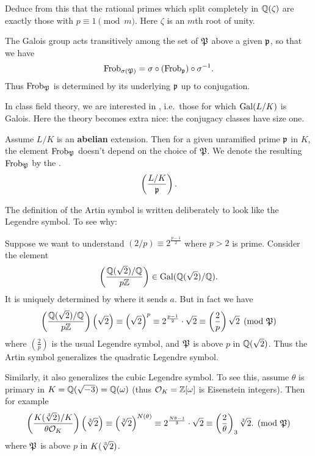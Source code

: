 \begin{exercise}
	Deduce from this that the rational primes which split completely
	in $\mathbb Q(\zeta)$ are exactly those with $p \equiv 1 \pmod m$.
	Here $\zeta$ is an $m$th root of unity.
\end{exercise}

The Galois group acts transitively among the set of $\mathfrak P$ above a given $\mathfrak p$,
so that we have
\[ \mathrm{Frob}_{\sigma(\mathfrak P)} = \sigma \circ (\mathrm{Frob}_{\mathfrak p}) \circ \sigma^{-1}.  \]
Thus $\mathrm{Frob}_\mathfrak P$ is determined by its underlying $\mathfrak p$ up to conjugation.

In class field theory, we are interested in ,
i.e.\ those for which $\operatorname{Gal}(L/K)$ is Galois.
Here the theory becomes extra nice:
the conjugacy classes have size one.
\begin{definition}
	Assume $L/K$ is an \textbf{abelian} extension.
	Then for a given unramified prime $\mathfrak p$ in $K$,
	the element $\mathrm{Frob}_\mathfrak P$ doesn't depend on the choice of $\mathfrak P$.
	We denote the resulting $\mathrm{Frob}_\mathfrak P$ by the .
	\[ \left( \frac{L/K}{\mathfrak p} \right). \]
\end{definition}
The definition of the Artin symbol is written deliberately to
look like the Legendre symbol.
To see why:
\begin{example}
	Suppose we want to understand
	$(2/p) \equiv 2^{\frac{p-1}{2}}$ where $p > 2$ is prime.
	Consider the element
	\[ \left( \frac{\mathbb Q(\sqrt 2)/\mathbb Q}{p\mathbb Z} \right)
		\in \operatorname{Gal}(\mathbb Q(\sqrt 2) / \mathbb Q). \]
	It is uniquely determined by where it sends $a$.
	But in fact we have
	\[
		\left( \frac{\mathbb Q(\sqrt 2)/\mathbb Q}{p\mathbb Z} \right) \left( \sqrt 2 \right)
		\equiv \left( \sqrt 2 \right)^{p}
		\equiv 2^{\frac{p-1}{2}} \cdot \sqrt 2
		\equiv \left( \frac 2p \right) \sqrt 2
		\pmod{\mathfrak P}
	\]
	where $\left( \frac 2p \right)$ is the usual Legendre symbol,
	and $\mathfrak P$ is above $p$ in $\mathbb Q(\sqrt 2)$.
	Thus the Artin symbol generalizes the quadratic Legendre symbol.
\end{example}
\begin{example}
	Similarly, it also generalizes the cubic Legendre symbol.
	To see this, assume $\theta$ is primary in $K = \mathbb Q(\sqrt{-3}) = \mathbb Q(\omega)$
	(thus $\mathcal O_K = \mathbb Z[\omega]$ is Eisenstein integers).
	Then for example
	\[
		\left( \frac{K(\sqrt[3]{2})/K}{\theta \mathcal O_K} \right) \left( \sqrt[3]{2} \right)
		\equiv \left( \sqrt[3]{2} \right)^{N(\theta)}
		\equiv 2^{\frac{N\theta-1}{3}} \cdot \sqrt 2
		\equiv \left( \frac{2}{\theta} \right)_3 \sqrt[3]{2}.
		\pmod{\mathfrak P}
	\]
	where $\mathfrak P$ is above $p$ in $K(\sqrt[3]{2})$.
\end{example}

